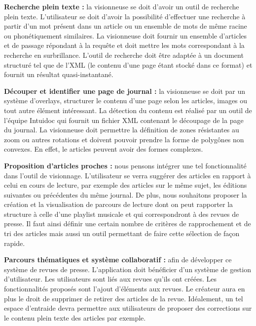     \textbf{Recherche plein texte :} la visionneuse se doit d’avoir un outil de recherche plein texte. L’utilisateur se doit d’avoir la possibilité
    d’effectuer une recherche à partir d’un mot présent dans un article ou un ensemble de mots de même racine ou phonétiquement similaires.
    La visionneuse doit fournir un ensemble d’articles et de passage répondant à la requête et doit mettre les mots correspondant à la recherche en
    surbrillance. %
    L’outil de recherche doit être adaptée à un document structuré tel que de l’XML (le contenu d’une page étant stocké dans ce format) et fournit
    un résultat quasi-instantané. %


    \textbf{Découper et identifier une page de journal :} la visionneuse se doit par un système d’overlays, structurer le contenu d’une page selon
    les articles, images ou tout autre élément intéressant. La détection du contenu est réalisé par un outil de l’équipe Intuidoc qui fournit un
    fichier XML contenant le découpage de la page du journal. La visionneuse doit permettre la définition de zones résistantes au zoom ou autres
    rotations et doivent pouvoir prendre la forme de polygônes non convexes. En effet, le articles peuvent avoir des formes complexes.


    \textbf{Proposition d’articles proches :} nous pensons intégrer une tel fonctionnalité dans l’outil de visionnage. L'utilisateur se verra
    suggérer des articles en rapport à celui en cours de lecture, par exemple des articles sur le même sujet, les éditions suivantes ou précédentes
    du même journal. De plus, nous souhaitons proposer la création et la visualisation de parcours de lecture dont on peut rapporter la structure
    à celle d’une playlist musicale et qui correspondront à des revues de presse. Il faut ainsi définir une certain nombre de critères de rapprochement
    et de tri des articles mais aussi un outil permettant de faire cette sélection de façon rapide.


    \textbf{Parcours thématiques et système collaboratif :} afin de développer ce système de revues de presse. L’application doit bénéficier d’un
    système de gestion d’utilisateur. Les utilisateurs sont liés aux revues qu’ils ont créées. Les fonctionnalités proposés sont l’ajout d'éléments
    aux revues. Le créateur aura en plus le droit de supprimer de retirer des articles de la revue. Idéalement, un tel espace d’entraide devra permettre
    aux utilisateurs de proposer des corrections sur le contenu plein texte des articles par exemple.
